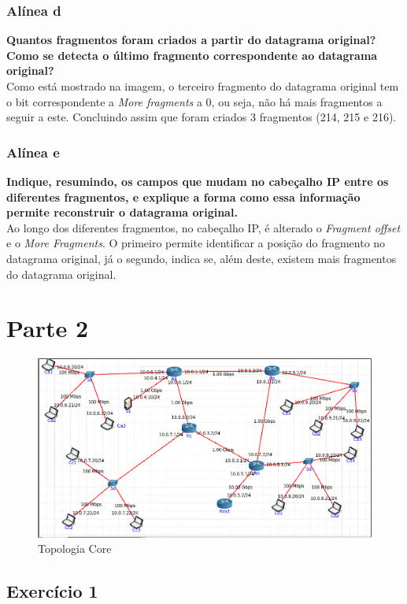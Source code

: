 \documentclass[a4paper]{report}
\begin{document}
\subsection{Alínea d}
\textbf{Quantos fragmentos foram criados a partir do datagrama original?
Como se detecta o último fragmento correspondente ao datagrama original?}\\
Como está mostrado na imagem, o terceiro fragmento do datagrama original
tem o bit correspondente a \textit{More fragments} a 0, ou seja, não há mais 
fragmentos a seguir a este. Concluindo assim que foram criados 3 fragmentos 
(214, 215 e 216).

\subsection{Alínea e}
\textbf{Indique, resumindo, os campos que mudam no cabeçalho IP entre 
os diferentes fragmentos, e explique a forma como essa informação permite
reconstruir o datagrama original.}\\
Ao longo dos diferentes fragmentos, no cabeçalho IP, é alterado o
\textit{Fragment offset} e o \textit{More Fragments}. O primeiro permite
identificar a posição do fragmento no datagrama original, já o segundo, indica
se, além deste, existem mais fragmentos do datagrama original.


\chapter{Parte 2}

\begin{figure}[H]
    \centering 
    \includegraphics[width=\textwidth]{images/topologiaCore.png}
    \caption{Topologia Core}
    \label{fig:topologiaCore}
\end{figure}

\section{Exercício 1}
\end{document}
